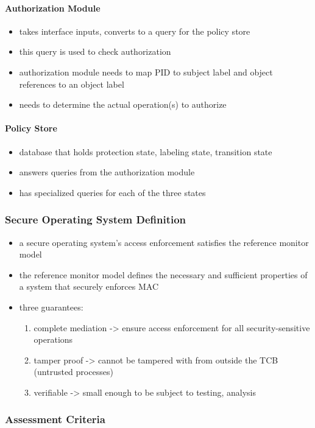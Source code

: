 \documentclass[
  12pt]{findlay}
\providecommand{\tightlist}{%
  \setlength{\itemsep}{0pt}\setlength{\parskip}{0pt}}
\begin{document}
\hypertarget{authorization-module}{%
\paragraph{Authorization Module}\label{authorization-module}}

\begin{itemize}
\tightlist
\item
  takes interface inputs, converts to a query for the policy store
\item
  this query is used to check authorization
\item
  authorization module needs to map PID to subject label and object
  references to an object label
\item
  needs to determine the actual operation(s) to authorize
\end{itemize}

\hypertarget{policy-store}{%
\paragraph{Policy Store}\label{policy-store}}

\begin{itemize}
\tightlist
\item
  database that holds protection state, labeling state, transition state
\item
  answers queries from the authorization module
\item
  has specialized queries for each of the three states
\end{itemize}

\hypertarget{secure-operating-system-definition}{%
\subsubsection{Secure Operating System
Definition}\label{secure-operating-system-definition}}

\begin{itemize}
\tightlist
\item
  a secure operating system's access enforcement satisfies the reference
  monitor model
\item
  the reference monitor model defines the necessary and sufficient
  properties of a system that securely enforces MAC
\item
  three guarantees:

  \begin{enumerate}
  \def\labelenumi{(\arabic{enumi})}
  \tightlist
  \item
    complete mediation -\textgreater{} ensure access enforcement for all
    security-sensitive operations
  \item
    tamper proof -\textgreater{} cannot be tampered with from outside
    the TCB (untrusted processes)
  \item
    verifiable -\textgreater{} small enough to be subject to testing,
    analysis
  \end{enumerate}
\end{itemize}

\hypertarget{assessment-criteria}{%
\subsubsection{Assessment Criteria}\label{assessment-criteria}}

\printbibliography
\end{document}
